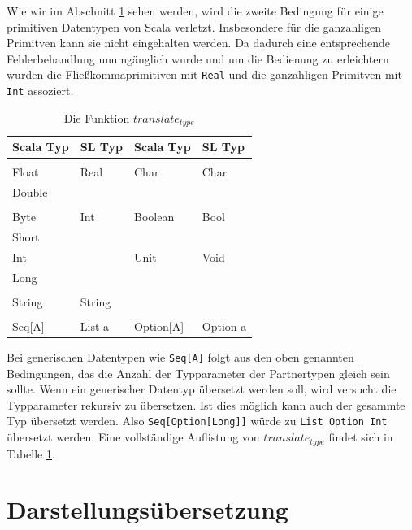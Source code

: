 \documentclass[12pt]{scrreprt}
\begin{document}
Wie wir im Abschnitt \ref{sec:value-transformation} sehen werden, wird die zweite Bedingung für einige primitiven Datentypen von Scala verletzt. Insbesondere für die ganzahligen Primitven kann sie nicht eingehalten werden. Da dadurch eine entsprechende Fehlerbehandlung unumgänglich wurde und um die Bedienung zu erleichtern wurden die Fließkommaprimitiven mit \lstinline!Real! und die ganzahligen Primitven mit \lstinline!Int! assoziert.


\begin{table}[h]
\caption{Die Funktion $translate_{type}$}
\centering
\begin{tabular}{ll|ll}
Scala Typ & \ac{SL} Typ & Scala Typ & \ac{SL} Typ \\
\hline
\\
Float     & Real        & Char      & Char \\
Double    & \\
          &             &           & \\
Byte      & Int         & Boolean   & Bool \\
Short     & \\
Int       &             & Unit      &  Void \\
Long      & \\
          &             &           & \\
String    & String \\
          &             &           & \\
Seq[A]    & List a      & Option[A] & Option a

\end{tabular}
\label{tab:translate_type}
\end{table}

Bei generischen Datentypen wie \lstinline!Seq[A]! folgt aus den oben genannten Bedingungen, das die Anzahl der Typparameter der Partnertypen gleich sein sollte. Wenn ein generischer Datentyp übersetzt werden soll, wird versucht die Typparameter rekursiv zu übersetzen. Ist dies möglich kann auch der gesammte Typ übersetzt werden. Also \lstinline!Seq[Option[Long]]! würde zu \lstinline!List Option Int! übersetzt werden. Eine vollständige Auflistung von $translate_{type}$ findet sich in Tabelle \ref{tab:translate_type}.

\section{Darstellungsübersetzung}
\label{sec:value-transformation}
\end{document}
